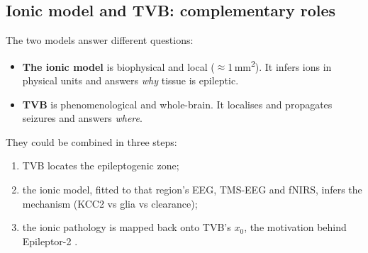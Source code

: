 \subsection{Ionic model and TVB: complementary roles}

The two models answer different questions:
\begin{itemize}
\item \textbf{The ionic model} is biophysical and local ($\approx$1\,mm\textsuperscript{2}). It infers ions in physical units and answers \emph{why} tissue is epileptic.
\item \textbf{TVB} is phenomenological and whole-brain. It localises and propagates seizures and answers \emph{where}.
\end{itemize}
They could be combined in three steps:
\begin{enumerate}
\item TVB locates the epileptogenic zone;
\item the ionic model, fitted to that region's EEG, TMS-EEG and fNIRS, infers the mechanism (KCC2 vs glia vs clearance);
\item the ionic pathology is mapped back onto TVB's $x_0$, the motivation behind Epileptor-2 \cite{chizhov2018}.
\end{enumerate}
